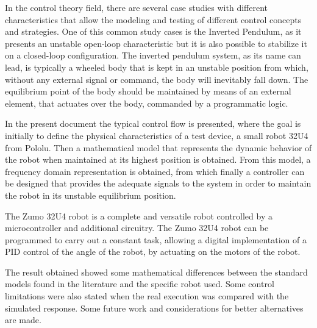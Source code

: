 
In the control theory field, there are several case studies with different characteristics that allow the modeling and testing of different control concepts and strategies. One of this common study cases is the Inverted Pendulum, as it presents an unstable open-loop characteristic but it is also possible to stabilize it on a closed-loop configuration. The inverted pendulum system, as its name can lead, is typically a wheeled body that is kept in an unstable position from which, without any external signal or command, the body will inevitably fall down. The equilibrium point of the body should be maintained by means of an external element, that actuates over the body, commanded by a programmatic logic.

In the present document the typical control flow is presented, where the goal is initially to define the physical characteristics of a test device, a small robot 32U4 from Pololu. Then a mathematical model that represents the dynamic behavior of the robot when maintained at its highest position is obtained. From this model, a frequency domain representation is obtained, from which finally a controller can be designed that provides the adequate signals to the system in order to maintain the robot in its unstable equilibrium position.

The Zumo 32U4 robot is a complete and versatile robot controlled by a microcontroller and additional circuitry. The Zumo 32U4 robot can be programmed to carry out a constant task, allowing a digital implementation of a PID control of the angle of the robot, by actuating on the motors of the robot.

The result obtained showed some mathematical differences between the standard models found in the literature and the specific robot used. Some control limitations were also stated when the real execution was compared with the simulated response. Some future work and considerations for better alternatives are made.
